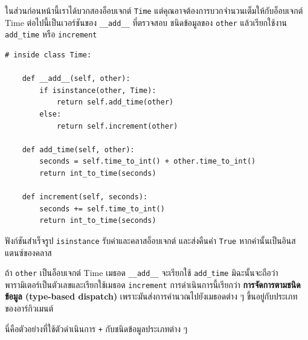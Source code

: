 
ในส่วนก่อนหน้านี้เราได้บวกสองอ็อบเจกต์ \texttt{Time} แต่คุณอาจต้องการบวกจำนวนเต็มให้กับอ็อบเจกต์ Time ต่อไปนี้เป็นเวอร์ชันของ \verb"__add__" ที่ตรวจสอบ
ชนิดข้อมูลของ \texttt{other} แล้วเรียกใช้งาน \verb"add_time" หรือ {\tt increment}

\begin{verbatim}
# inside class Time:

    def __add__(self, other):
        if isinstance(other, Time):
            return self.add_time(other)
        else:
            return self.increment(other)

    def add_time(self, other):
        seconds = self.time_to_int() + other.time_to_int()
        return int_to_time(seconds)

    def increment(self, seconds):
        seconds += self.time_to_int()
        return int_to_time(seconds)
\end{verbatim}
%

ฟังก์ชันสำเร็จรูป {\tt isinstance} รับค่าและคลาสอ็อบเจกต์
และส่งคืนค่า {\tt True} หากค่านั้นเป็นอินสแตนซ์ของคลาส


ถ้า {\tt other} เป็นอ็อบเจกต์ Time เมธอด \verb"__add__" จะเรียกใช้ \verb"add_time" 
มิฉะนั้นจะถือว่าพารามิเตอร์เป็นตัวเลขและเรียกใช้เมธอด {\tt increment}  การดำเนินการนี้เรียกว่า {\bf การจัดการตามชนิดข้อมูล  (type-based dispatch)}
เพราะมันส่งการคำนวณไปยังเมธอดต่าง ๆ ขึ้นอยู่กับประเภทของอาร์กิวเมนต์


นี่คือตัวอย่างที่ใช้ตัวดำเนินการ {\tt +} กับชนิดข้อมูลประเภทต่าง ๆ

